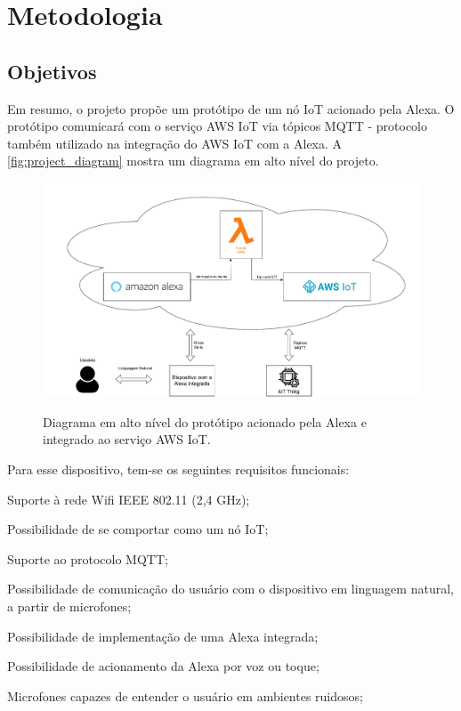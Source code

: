\chapter{Metodologia}\label{chapter:metodologia}

\section{Objetivos}\label{section:objetivos}

Em resumo, o projeto propõe um protótipo de um nó IoT acionado pela Alexa. O protótipo comunicará com o serviço AWS IoT via tópicos MQTT - protocolo também utilizado na integração do AWS IoT com a Alexa. A \autoref{fig:project_diagram} mostra um diagrama em alto nível do projeto.

\begin{figure}[htbp]
    \centering
    \caption{Diagrama em alto nível do protótipo acionado pela Alexa e integrado ao serviço AWS IoT.}
    \includegraphics[scale=0.47]{Imagens/project_diagram.pdf}
    \label{fig:project_diagram}
\end{figure}

Para esse dispositivo, tem-se os seguintes requisitos funcionais:

\begin{alineas}
    \item Suporte à rede Wifi IEEE 802.11 (2,4 GHz);
    \item Possibilidade de se comportar como um nó IoT;
    \item Suporte ao protocolo MQTT;
    \item Possibilidade de comunicação do usuário com o dispositivo em linguagem natural, a partir de microfones;
    \item Possibilidade de implementação de uma Alexa integrada;
    \item Possibilidade de acionamento da Alexa por voz ou toque;
    \item Microfones capazes de entender o usuário em ambientes ruidosos;
\end{alineas}

